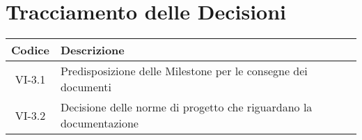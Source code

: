 \section*{Tracciamento delle Decisioni}

\begin{center}
	\begin{longtable}{|c|p{14.5cm}|}
	\hline
	\rowcolor{lighter-grayer}
	\textbf{Codice} & \textbf{Descrizione} \\
	\hline
	\endfirsthead

	\hline
	VI-3.1 & Predisposizione delle Milestone per le consegne dei documenti \\
	VI-3.2 & Decisione delle norme di progetto che riguardano la documentazione \\
	\hline
	
	\end{longtable}
\end{center}